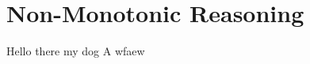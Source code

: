 \chapter{Non-Monotonic Reasoning}
\label{chapter:non-monotonic-reasoning}

Hello there my dog A
wfaew